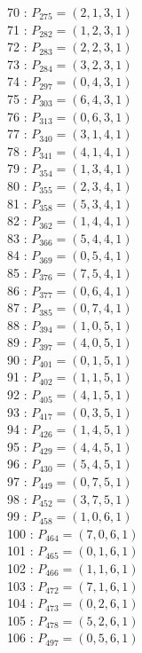 \documentclass{article}
\begin{document}
{\begin{multicols}{3}
70 : $P_{275}=( 2, 1, 3, 1 )$\\
71 : $P_{282}=( 1, 2, 3, 1 )$\\
72 : $P_{283}=( 2, 2, 3, 1 )$\\
73 : $P_{284}=( 3, 2, 3, 1 )$\\
74 : $P_{297}=( 0, 4, 3, 1 )$\\
75 : $P_{303}=( 6, 4, 3, 1 )$\\
76 : $P_{313}=( 0, 6, 3, 1 )$\\
77 : $P_{340}=( 3, 1, 4, 1 )$\\
78 : $P_{341}=( 4, 1, 4, 1 )$\\
79 : $P_{354}=( 1, 3, 4, 1 )$\\
80 : $P_{355}=( 2, 3, 4, 1 )$\\
81 : $P_{358}=( 5, 3, 4, 1 )$\\
82 : $P_{362}=( 1, 4, 4, 1 )$\\
83 : $P_{366}=( 5, 4, 4, 1 )$\\
84 : $P_{369}=( 0, 5, 4, 1 )$\\
85 : $P_{376}=( 7, 5, 4, 1 )$\\
86 : $P_{377}=( 0, 6, 4, 1 )$\\
87 : $P_{385}=( 0, 7, 4, 1 )$\\
88 : $P_{394}=( 1, 0, 5, 1 )$\\
89 : $P_{397}=( 4, 0, 5, 1 )$\\
90 : $P_{401}=( 0, 1, 5, 1 )$\\
91 : $P_{402}=( 1, 1, 5, 1 )$\\
92 : $P_{405}=( 4, 1, 5, 1 )$\\
93 : $P_{417}=( 0, 3, 5, 1 )$\\
94 : $P_{426}=( 1, 4, 5, 1 )$\\
95 : $P_{429}=( 4, 4, 5, 1 )$\\
96 : $P_{430}=( 5, 4, 5, 1 )$\\
97 : $P_{449}=( 0, 7, 5, 1 )$\\
98 : $P_{452}=( 3, 7, 5, 1 )$\\
99 : $P_{458}=( 1, 0, 6, 1 )$\\
100 : $P_{464}=( 7, 0, 6, 1 )$\\
101 : $P_{465}=( 0, 1, 6, 1 )$\\
102 : $P_{466}=( 1, 1, 6, 1 )$\\
103 : $P_{472}=( 7, 1, 6, 1 )$\\
104 : $P_{473}=( 0, 2, 6, 1 )$\\
105 : $P_{478}=( 5, 2, 6, 1 )$\\
106 : $P_{497}=( 0, 5, 6, 1 )$\\

\end{multicols}}
\end{document}

